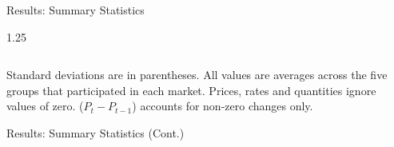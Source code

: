 \documentclass[10pt]{beamer}
\begin{document}
\begin{frame}{Results: Summary Statistics}
\begin{table}[H]
{\begin{threeparttable}
\begin{spacing}{1.25}
\begin{tabular}{lcccc}
                \hline
                \hline
            \end{tabular}
            \end{spacing}
            \vspace{.5em}
            \begin{tablenotes}\noindent\justifying\scriptsize Standard deviations are in parentheses. All values are averages across the five groups that participated in each market. Prices, rates and quantities ignore values of zero. ($P_{t} - P_{t - 1}$) accounts for non-zero changes only. \end{tablenotes}
        \end{threeparttable}}
    \end{table}
\end{frame}

\begin{frame}{Results: Summary Statistics (Cont.)}
    \begin{table}[H]
        \footnotesize
\end{table}
\end{frame}
\end{document}
